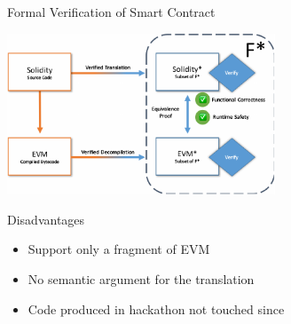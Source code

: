 \begin{frame}{Formal Verification of Smart Contract~\cite{bhargavan2016formal}}
\begin{center}
\includegraphics[width=0.6\textwidth]{./img/formal-verification-of-smart--contract.pdf}
\end{center}

\begin{block}{Disadvantages}
\begin{itemize}
\item Support only a fragment of EVM
\item No semantic argument for the translation
\item Code produced in hackathon not touched since
\end{itemize}
\end{block}
\end{frame}